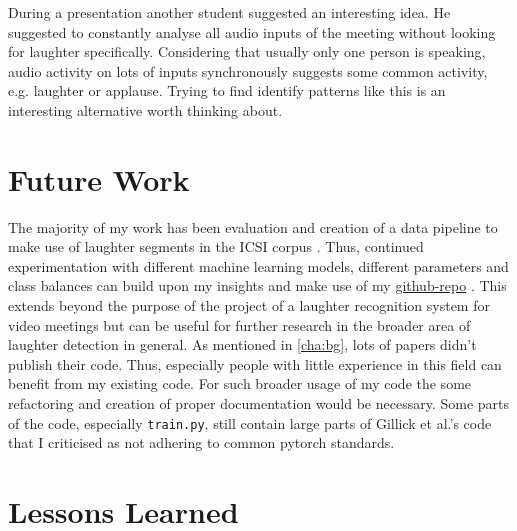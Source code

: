 \documentclass[bsc,frontabs,parskip,deptreport]{infthesis}
\newcommand{\coderepo}{\href{https://github.com/LasseWolter/laughter-detection-icsi}{github-repo} }
\begin{document}
During a presentation another student suggested an interesting idea. He suggested to constantly analyse all audio inputs of the meeting without looking for laughter specifically. Considering that usually only one person is speaking, audio activity on lots of inputs synchronously suggests some common activity, e.g. laughter or applause. Trying to find identify patterns like this is an interesting alternative worth thinking about. 

\chapter{Future Work}
The majority of my work has been evaluation and creation of a data pipeline to make use of laughter segments in the ICSI corpus \citep{morgan2001meeting}. Thus, continued experimentation with different machine learning models, different parameters and class balances can build upon my insights and make use of my \coderepo.
This extends beyond the purpose of the project of a laughter recognition system for video meetings but can be useful for further research in the broader area of laughter detection in general. 
As mentioned in \autoref{cha:bg}, lots of papers didn't publish their code.
Thus, especially people with little experience in this field can benefit from my existing code. 
For such broader usage of my code the some refactoring and creation of proper documentation would be necessary.
Some parts of the code, especially \verb|train.py|, still contain large parts of Gillick et al.'s code that I criticised as not adhering to common pytorch standards. 


\chapter{Lessons Learned}
\end{document}
